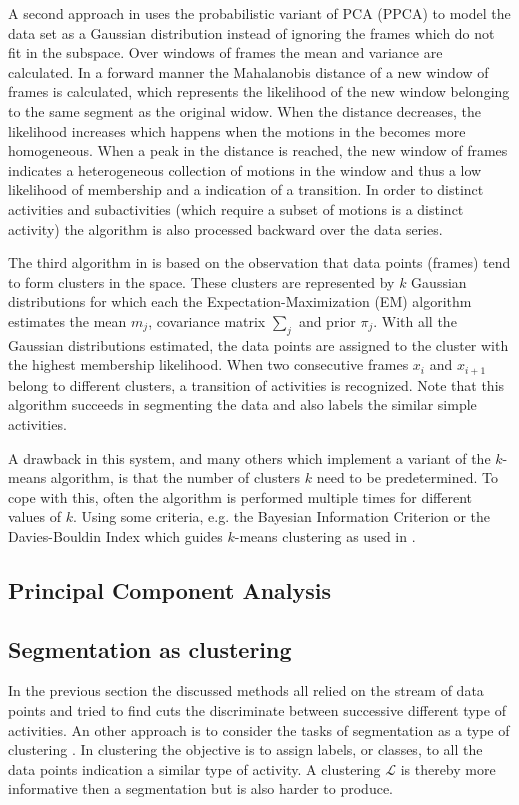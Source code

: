 A second approach in \cite{barbivc2004segmenting} uses the probabilistic 
variant of PCA (PPCA) to model the data set as a Gaussian distribution instead 
of ignoring the frames which do not fit in the subspace. Over windows of 
frames the mean and variance are calculated. In a forward manner the 
Mahalanobis distance of a new window of frames is calculated, which represents 
the likelihood of the new window belonging to the same segment as the original 
widow. When the distance decreases, the likelihood increases which happens 
when the motions in the becomes more homogeneous. When a peak in the distance 
is reached, the new window of frames indicates a heterogeneous collection of 
motions in the window and thus a low likelihood of membership and a indication 
of a transition. In order to distinct activities and subactivities (which 
require a subset of motions is a distinct activity) the algorithm is also 
processed backward over the data series.

The third algorithm in \cite{barbivc2004segmenting} is based on the 
observation that data points (frames) tend to form clusters in the space. 
These clusters are represented by $k$ Gaussian distributions for which each 
the Expectation-Maximization (EM) algorithm estimates the mean $m_j$, 
covariance matrix $\sum_{j}$ and prior $\pi_j$. With all the Gaussian 
distributions estimated, the data points are assigned to the cluster with the 
highest membership likelihood. When two consecutive frames $x_i$ and $x_{i+1}$ 
belong to different clusters, a transition of activities is recognized. Note 
that this algorithm succeeds in segmenting the data and also labels the 
similar simple activities.

A drawback in this system, and many others which implement a variant of the 
$k$-means algorithm, is that the number of clusters $k$ need to be 
predetermined. To cope with this, often the algorithm is performed multiple 
times for different values of $k$. Using some criteria, e.g. the Bayesian 
Information Criterion \cite{pelleg2000x} or the Davies-Bouldin Index which 
guides $k$-means clustering as used in \cite{krause2003unsupervised}.

\subsection{Principal Component Analysis}

\subsection{Segmentation as clustering}
In the previous section the discussed methods all relied on the stream of data 
points and tried to find cuts the discriminate between successive different 
type of activities. An other approach is to consider the tasks of segmentation 
as a type of clustering \cite{zhou2008aligned}. In clustering the objective is 
to assign labels, or classes, to all the data points indication a similar type 
of activity. A clustering $\mathcal{L}$ is thereby more informative then a 
segmentation but is also harder to produce.

